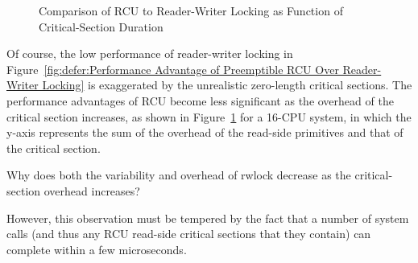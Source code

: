 \begin{figure}[tb]
\centering
{}
\caption{Comparison of RCU to Reader-Writer Locking as Function of Critical-Section Duration}
\label{fig:defer:Comparison of RCU to Reader-Writer Locking as Function of Critical-Section Duration}
\end{figure}

Of course, the low performance of reader-writer locking in
Figure~\ref{fig:defer:Performance Advantage of Preemptible RCU Over Reader-Writer Locking}
is exaggerated by the unrealistic zero-length critical sections.
The performance advantages of RCU become less significant as the overhead
of the critical section increases, as shown in
Figure~\ref{fig:defer:Comparison of RCU to Reader-Writer Locking as Function of Critical-Section Duration}
for a 16-CPU system,
in which the y-axis represents the sum of the overhead
of the read-side primitives and that of the critical section.

\QuickQuiz{}
	Why does both the variability and overhead of rwlock decrease as the
	critical-section overhead increases?
 \QuickQuizEnd

However, this observation must be tempered by the fact that
a number of system calls (and thus any RCU read-side critical sections
that they contain) can complete within a few microseconds.

